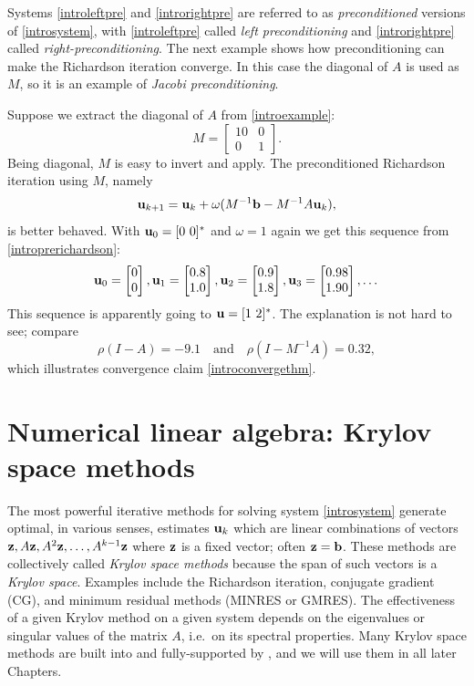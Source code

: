 Systems \eqref{introleftpre} and \eqref{introrightpre} are referred to as \emph{preconditioned} versions of \eqref{introsystem}, with \eqref{introleftpre} called \emph{left preconditioning} and \eqref{introrightpre} called \emph{right-preconditioning}.  The next example shows how preconditioning can make the Richardson iteration converge.  In this case the diagonal of $A$ is used as $M$, so it is an example of \emph{Jacobi preconditioning}.

\medskip\noindent\hrulefill
\begin{examplecont}  Suppose we extract the diagonal of $A$ from  \eqref{introexample}:
\begin{equation}
M = \begin{bmatrix}
10 & 0 \\ 0 & 1
\end{bmatrix}.  \label{introM}
\end{equation}
Being diagonal, $M$ is easy to invert and apply.  The preconditioned Richardson iteration using $M$, namely
\begin{equation}
\mathbf{u}_{k+1} = \mathbf{u}_k + \omega (M^{-1} \mathbf{b} - M^{-1} A \mathbf{u}_k),  \label{introprerichardson}
\end{equation}
is better behaved.  With $\mathbf{u}_0 = [0\,\, 0]^*$ and $\omega=1$ again we get this sequence from \eqref{introprerichardson}:
\begin{equation}
\mathbf{u}_{0} = \begin{bmatrix} 0 \\ 0 \end{bmatrix}, \mathbf{u}_{1} = \begin{bmatrix} 0.8 \\ 1.0 \end{bmatrix}, \mathbf{u}_{2} = \begin{bmatrix} 0.9 \\ 1.8 \end{bmatrix}, \mathbf{u}_{3} = \begin{bmatrix} 0.98 \\ 1.90 \end{bmatrix}, \dots
\end{equation}
This sequence is apparently going to $\mathbf{u} = [1\,\, 2]^*$.  The explanation is not hard to see; compare
\begin{equation}
\rho(I-A) = -9.1 \quad \text{and} \quad \rho(I-M^{-1} A) = 0.32,
\end{equation}
which illustrates convergence claim \eqref{introconvergethm}.
\end{examplecont}
\noindent\hrulefill


\section{Numerical linear algebra: Krylov space methods}

The most powerful iterative methods for solving system \eqref{introsystem} generate optimal, in various senses, estimates $\mathbf{u}_k$ which are linear combinations of vectors $\mathbf{z},A\mathbf{z},A^2\mathbf{z},\dots,A^{k-1}\mathbf{z}$ where $\mathbf{z}$ is a fixed vector; often $\mathbf{z}=\mathbf{b}$.  These methods are collectively called \emph{Krylov space methods} because the span of such vectors is a \emph{Krylov space}.  Examples include the Richardson iteration, conjugate gradient (CG), and minimum residual methods (MINRES or GMRES).  The effectiveness of a given Krylov method on a given system depends on the eigenvalues or singular values of the matrix $A$, i.e.~on its spectral properties.  Many Krylov space methods are built into and fully-supported by \PETSc, and we will use them in all later Chapters.

